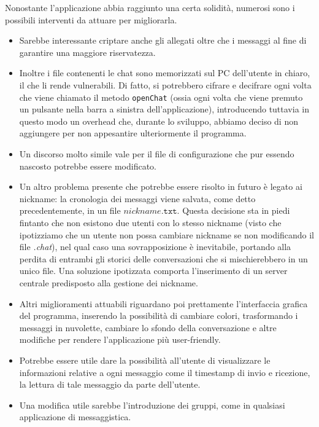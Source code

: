Nonostante l'applicazione abbia raggiunto una certa solidità,
numerosi sono i possibili interventi da attuare per migliorarla.
\begin{itemize}
	\item Sarebbe interessante criptare anche gli allegati oltre che i
	messaggi al fine di garantire una maggiore riservatezza.
	\item Inoltre i file contenenti le chat sono memorizzati sul PC
	dell'utente in chiaro, il che li rende vulnerabili. Di fatto, si potrebbero cifrare e decifrare ogni volta che 	
	viene chiamato il metodo \texttt{openChat} (ossia ogni volta che viene premuto un pulsante nella barra a 
	sinistra dell'applicazione), introducendo tuttavia in questo modo un overhead che, durante lo sviluppo, abbiamo
	deciso di non aggiungere per non appesantire ulteriormente il programma.
	\item Un discorso molto simile vale per il file di configurazione che pur essendo nascosto potrebbe essere 
	modificato. 
	\item Un altro problema presente che potrebbe essere risolto in futuro è legato ai nickname: la cronologia dei 
	messaggi viene salvata, come detto precedentemente, in un file $ \texttt{$nickname$.txt} $. Questa decisione sta 
	in piedi fintanto che non esistono due utenti con lo stesso nickname (visto che ipotizziamo che un utente non 
	possa cambiare nickname se non modificando il file \emph{.chat}), nel qual caso una sovrapposizione è 
	inevitabile, portando alla perdita di entrambi gli storici delle conversazioni che si mischierebbero in un unico 
	file. Una soluzione ipotizzata comporta l'inserimento di un server centrale predisposto alla gestione dei 
	nickname.
	\item Altri miglioramenti attuabili riguardano poi prettamente l'interfaccia grafica del programma, inserendo la 
	possibilità di cambiare colori, trasformando i messaggi in nuvolette, cambiare lo sfondo della conversazione e 
	altre modifiche per rendere l'applicazione più user-friendly.
	\item Potrebbe essere utile dare la possibilità all'utente di visualizzare le informazioni relative a ogni 
	messaggio come il timestamp di invio e ricezione, la lettura di tale messaggio da parte dell'utente.
	\item Una modifica utile sarebbe l'introduzione dei gruppi, come in qualsiasi applicazione di messaggistica.	\end{itemize}